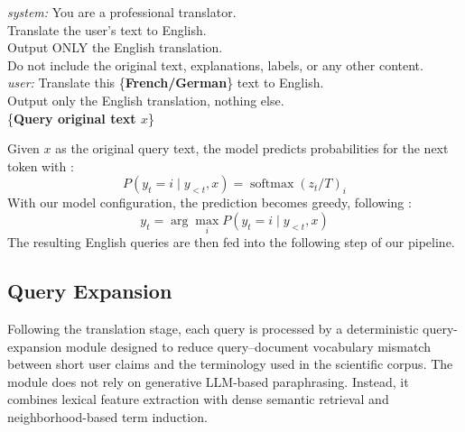 \begin{promptbox}
    \small
    \ttfamily
    \begin{flushleft}
        \textit{system:} You are a professional translator.\\
        Translate the user's text to English.\\
        Output ONLY the English translation.\\
        Do not include the original text, explanations, labels, or any other content.\\[0.8em]

        \textit{user:} Translate this \{\textbf{French/German}\} text to English.\\
        Output only the English translation, nothing else.\\[0.8em]

        \{\textbf{Query original text $x$}\}
    \end{flushleft}
\end{promptbox}
Given $x$ as the original query text, the model predicts probabilities for the next token with \cite{huggingface_transformers_generation}:
$$P(y_t=i\mid y_{<t},x)=\operatorname{softmax}(z_t/T)_i$$
With our model configuration, the prediction becomes greedy, following \cite{utter_project_eurollm_9b_instruct_2512}: $$y_t=\arg\max_i P(y_t=i\mid y_{<t},x)$$
The resulting English queries are then fed into the following step of our pipeline.

\subsection{Query Expansion} \label{sub:query-expansion}

Following the translation stage, each query is processed by a deterministic query-expansion module designed to reduce query–document vocabulary mismatch between short user claims and the terminology used in the scientific corpus. The module does not rely on generative LLM-based paraphrasing. Instead, it combines lexical feature extraction with dense semantic retrieval and neighborhood-based term induction. 

